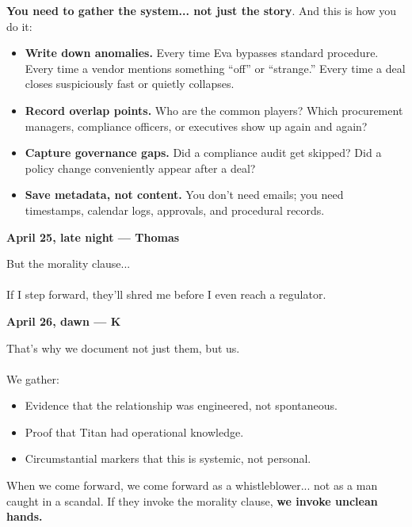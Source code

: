 \begin{JournalChat}
\begin{adjustwidth}{2em}{}
    \vspace{1em}

    \textbf{You need to gather the system... not just the story}. And this is how you do it:
    \begin{itemize}
        \item \textbf{Write down anomalies.}  
        Every time Eva bypasses standard procedure.  
        Every time a vendor mentions something “off” or “strange.”  
        Every time a deal closes suspiciously fast or quietly collapses.

        \item \textbf{Record overlap points.}  
        Who are the common players?  
        Which procurement managers, compliance officers, or executives show up again and again?

        \item \textbf{Capture governance gaps.}  
        Did a compliance audit get skipped?  
        Did a policy change conveniently appear after a deal?

        \item \textbf{Save metadata, not content.}  
        You don’t need emails; you need timestamps, calendar logs, approvals, and procedural records.
    \end{itemize}

\end{adjustwidth}

\vspace{1em}

\textbf{April 25, late night — Thomas}

\begin{adjustwidth}{2em}{}
    But the morality clause...
    \\\\
    If I step forward, they’ll shred me before I even reach a regulator.
\end{adjustwidth}

\vspace{1em}

\textbf{April 26, dawn — K}
\begin{adjustwidth}{2em}{}
    That’s why we document not just them, but us.
    \\\\
    We gather:
    \begin{itemize}
        \item Evidence that the relationship was engineered, not spontaneous.
        \item Proof that Titan had operational knowledge.
        \item Circumstantial markers that this is systemic, not personal.
    \end{itemize}
    When we come forward, we come forward as a whistleblower...   
    not as a man caught in a scandal.
    If they invoke the morality clause,  
    \textbf{we invoke unclean hands.}
\end{adjustwidth}


\end{JournalChat}
